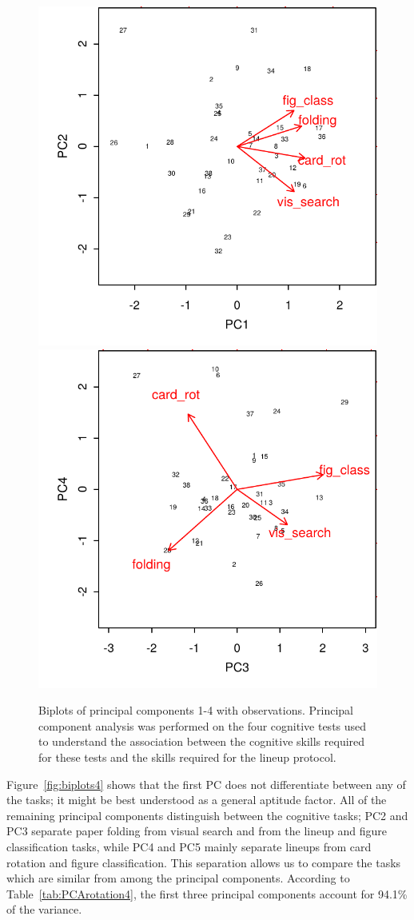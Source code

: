 \documentclass[11pt]{isuthesis}\usepackage[]{graphicx}\usepackage[]{color}
\newenvironment{knitrout}{}{} %
\begin{document}
\begin{knitrout}
\color{fgcolor}\begin{figure}

{\centering \includegraphics[width=.45\linewidth]{Figure/VisualAptitude/fig-biplot-pca4-1} 
\includegraphics[width=.45\linewidth]{Figure/VisualAptitude/fig-biplot-pca4-2} 

}

\caption[Biplots of principal components 1-4 with observations]{Biplots of principal components 1-4 with observations. Principal component analysis was performed on the four cognitive tests used to understand the association between the cognitive skills required for these tests and the skills required for the lineup protocol.  \label{fig:biplots4}}\label{fig:biplot-pca4}
\end{figure}


\end{knitrout}
Figure~\ref{fig:biplots4} shows that the first PC does not differentiate between any of the tasks; it might be best understood as a general aptitude factor. All of the remaining principal components distinguish between the cognitive tasks; 
PC2 and PC3 separate  paper folding from visual search and from the lineup and figure classification tasks, while PC4 and PC5 mainly separate lineups from card rotation and figure classification. This separation allows us to compare the tasks which are similar from among the principal components. 
According to Table~\ref{tab:PCArotation4}, the first three principal components account for 94.1\% of the variance.
\end{document}
